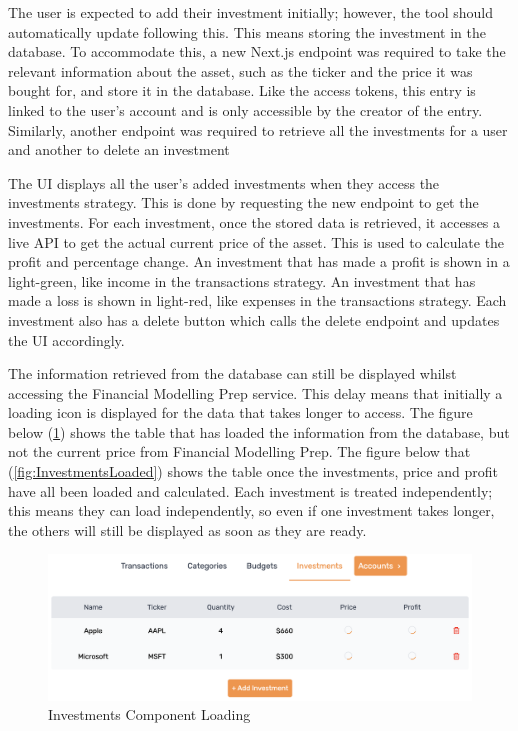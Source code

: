 The user is expected to add their investment initially; however, the tool should automatically update following this. This means storing the investment in the database. To accommodate this, a new Next.js endpoint was required to take the relevant information about the asset, such as the ticker and the price it was bought for, and store it in the database. Like the access tokens, this entry is linked to the user's account and is only accessible by the creator of the entry. Similarly, another endpoint was required to retrieve all the investments for a user and another to delete an investment

The UI displays all the user's added investments when they access the investments strategy. This is done by requesting the new endpoint to get the investments. For each investment, once the stored data is retrieved, it accesses a live API to get the actual current price of the asset. This is used to calculate the profit and percentage change. An investment that has made a profit is shown in a light-green, like income in the transactions strategy. An investment that has made a loss is shown in light-red, like expenses in the transactions strategy. Each investment also has a delete button which calls the delete endpoint and updates the UI accordingly.

The information retrieved from the database can still be displayed whilst accessing the Financial Modelling Prep service. This delay means that initially a loading icon is displayed for the data that takes longer to access. The figure below (\ref{fig:InvestmentsLoading}) shows the table that has loaded the information from the database, but not the current price from Financial Modelling Prep. The figure below that (\ref{fig:InvestmentsLoaded}) shows the table once the investments, price and profit have all been loaded and calculated. Each investment is treated independently; this means they can load independently, so even if one investment takes longer, the others will still be displayed as soon as they are ready.

\begin{figure}[H]
	\centering
	\includegraphics[width=\textwidth]{images/investments_loading.png}
	\caption{Investments Component Loading}
	\label{fig:InvestmentsLoading}
\end{figure}

